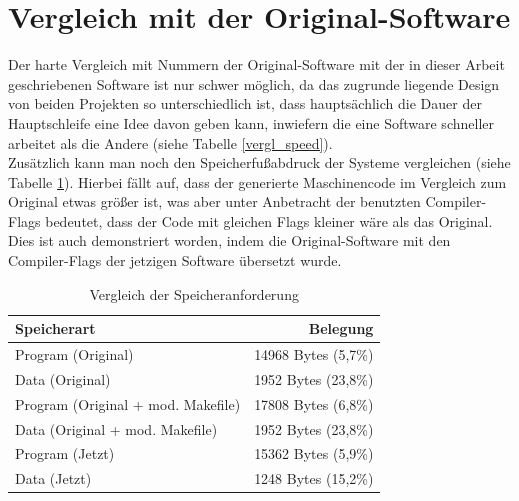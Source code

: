 \section{Vergleich mit der Original-Software}
Der harte Vergleich mit Nummern der Original-Software mit der in dieser Arbeit geschriebenen Software ist
nur schwer möglich, da das zugrunde liegende Design von beiden Projekten so unterschiedlich ist, dass hauptsächlich
die Dauer der Hauptschleife eine Idee davon geben kann, inwiefern die eine Software schneller arbeitet als die Andere
(siehe Tabelle \ref{vergl_speed}).\\
Zusätzlich kann man noch den Speicherfußabdruck der Systeme vergleichen (siehe Tabelle \ref{vergl_speicher}). Hierbei
fällt auf, dass der generierte Maschinencode im Vergleich zum Original etwas größer ist, was aber unter Anbetracht
der benutzten Compiler-Flags bedeutet, dass der Code mit gleichen Flags kleiner wäre als das Original. Dies ist
auch demonstriert worden, indem die Original-Software mit den Compiler-Flags der jetzigen Software übersetzt
wurde.
\begin{table}[htb]
\begin{center}
	\begin{tabular}{|l||r|}
		\hline
		\textbf{Speicherart} & \textbf{Belegung} \\ \hline \hline
		Program (Original) & 14968 Bytes (5,7\%)  \\ \hline
		Data (Original)& 1952 Bytes (23,8\%) \\ \hline \hline
		Program (Original + mod. Makefile) & 17808 Bytes (6,8\%)  \\ \hline
		Data (Original + mod. Makefile) & 1952 Bytes (23,8\%) \\ \hline \hline
		Program (Jetzt)& 15362 Bytes (5,9\%) \\ \hline
		Data (Jetzt)& 1248 Bytes (15,2\%) \\ \hline
	\end{tabular}
	\caption{\label{vergl_speicher} Vergleich der Speicheranforderung}
\end{center}
\end{table}
